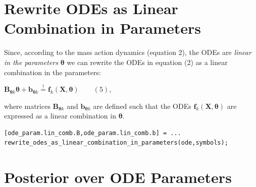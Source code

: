 \section{Rewrite ODEs as Linear Combination in Parameters}

\begin{par}
Since, according to the mass action dynamics (equation 2), the ODEs are \textit{linear in the parameters} $\boldsymbol\theta$ we can rewrite the ODEs in equation (2) as a linear combination in the parameters:
\end{par} \vspace{1em}
\begin{par}
$\mathbf{B}_{\boldsymbol{\theta} k} \boldsymbol{\theta} + \mathbf{b}_{\boldsymbol{\theta} k} \stackrel{!}{=}\mathbf{f}_k(\mathbf{X},\boldsymbol{\theta}) \qquad (5)$,
\end{par} \vspace{1em}
\begin{par}
where matrices $\mathbf{B}_{\boldsymbol{\theta} k}$ and $\mathbf{b}_{\boldsymbol{\theta} k}$ are defined such that the ODEs $\mathbf{f}_k(\mathbf{X},\boldsymbol{\theta})$ are expressed as a linear combination in $\boldsymbol{\theta}$.
\end{par} 
\color{RoyalPurple}\begin{verbatim}
[ode_param.lin_comb.B,ode_param.lin_comb.b] = ...
rewrite_odes_as_linear_combination_in_parameters(ode,symbols);
\end{verbatim}
\color{black}


\section{Posterior over ODE Parameters}

